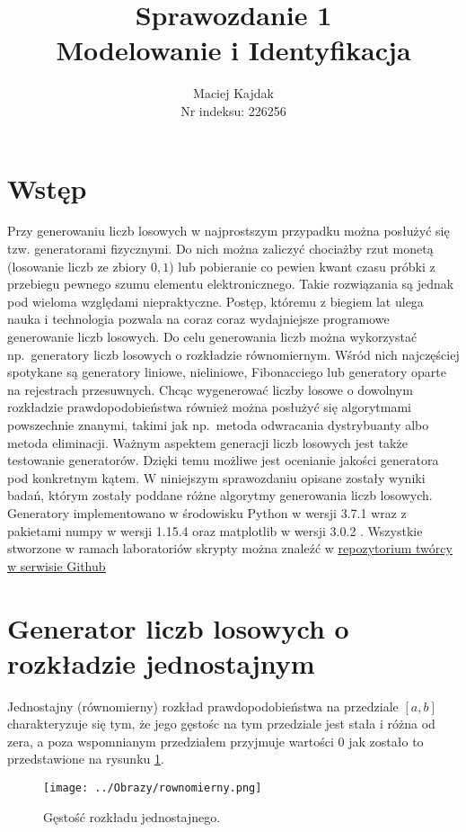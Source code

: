 \documentclass[12pt,a4paper]{article}
\author{Maciej Kajdak \\ Nr indeksu: 226256}
\title{Sprawozdanie 1 \\ \textbf{Modelowanie i Identyfikacja}}
\begin{document}
\maketitle
\section{Wstęp}
Przy generowaniu liczb losowych w najprostszym przypadku można posłużyć się tzw. generatorami fizycznymi. Do nich można zaliczyć chociażby rzut monetą (losowanie liczb ze zbiory ${0,1}$) lub pobieranie co pewien kwant czasu próbki z przebiegu pewnego szumu elementu elektronicznego. 
Takie rozwiązania są jednak pod wieloma względami niepraktyczne. Postęp, któremu z biegiem lat ulega nauka i technologia pozwala na coraz coraz wydajniejsze programowe generowanie liczb losowych.
Do celu generowania liczb można wykorzystać np.\ generatory liczb losowych o rozkładzie równomiernym. 
Wśród nich najczęściej spotykane są generatory liniowe, nieliniowe, Fibonacciego lub generatory oparte na rejestrach przesuwnych.
Chcąc wygenerować liczby losowe o dowolnym rozkładzie prawdopodobieństwa również można posłużyć się algorytmami powszechnie znanymi, takimi jak np.\ metoda odwracania dystrybuanty albo metoda eliminacji.
Ważnym aspektem generacji liczb losowych jest także testowanie generatorów.
Dzięki temu możliwe jest ocenianie jakości generatora pod konkretnym kątem.
W niniejszym sprawozdaniu opisane zostały wyniki badań, którym zostały poddane różne algorytmy generowania liczb losowych.
Generatory implementowano w środowisku Python w wersji 3.7.1 \cite{python3} wraz z pakietami numpy w wersji 1.15.4 \cite{numpy} oraz matplotlib w wersji 3.0.2 \cite{matplotlib}.
Wszystkie stworzone w ramach laboratoriów skrypty można znaleźć w \href{https://github.com/MacAndKaj/Modeling\_and\_Identification}{\underline{repozytorium twórcy w serwisie Github}}

\section{Generator liczb losowych o rozkładzie jednostajnym}
Jednostajny (równomierny) rozkład prawdopodobieństwa na przedziale $[a,b]$ charakteryzuje się tym, że jego gęstośc na tym przedziale jest stała i różna od zera, a poza wspomnianym przedziałem przyjmuje wartości $0$ jak zostało to przedstawione na rysunku \ref{fig:jednostajny}.

\begin{figure}[H]
\centering
\texttt{[image: ../Obrazy/rownomierny.png]} 
\caption{Gęstość rozkładu jednostajnego.}
\label{fig:jednostajny}
\end{figure}
\end{document}
